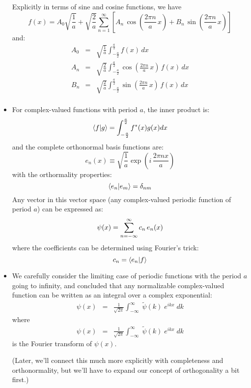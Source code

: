 \documentclass[12pt]{article}
\begin{document}
\begin{itemize}
Explicitly in terms of sine and cosine functions, we have
\begin{equation}
f(x) = A_0 \sqrt{\frac{1}{a}} + \sqrt{\frac{2}{a}} \sum_{n=1}^{\infty}  \left[ A_n \, \cos\left(\frac{2\pi n}{a} \, x \right) + B_n \, \sin\left(\frac{2\pi n}{a} \, x \right)\right]\label{eqn :lfs}
\end{equation}
and:
\begin{eqnarray*}
A_0 &=& \sqrt{\frac{1}{a}} \int_{-\frac{a}{2}}^{\frac{a}{2}} f(x) \, dx \\
A_n &=& \sqrt{\frac{2}{a}} \int_{-\frac{a}{2}}^{\frac{a}{2}} 
\cos\left(\frac{2\pi n}{a} \, x \right) \, f(x) \, dx \\
B_n &=& \sqrt{\frac{2}{a}} \int_{-\frac{a}{2}}^{\frac{a}{2}} 
\sin\left(\frac{2\pi n}{a} \, x \right) \, f(x) \, dx \\
\end{eqnarray*}

\item For complex-valued functions with period $a$, the inner product is:
\begin{equation}
\braket{f|g} = \int_{-\frac{a}{2}}^{\frac{a}{2}} f^*(x) g(x) dx
\end{equation}
and the complete orthonormal basis functions are:
\begin{equation}
e_n(x) \equiv \sqrt{\frac{1}{a}} \exp\left( i \, \frac{2 \pi n x}{a}\right)
\end{equation}
with the orthormality properties:
\begin{equation}
\braket{e_n|e_m} = \delta_{nm}
\end{equation}
Any vector in this vector space (any complex-valued periodic function of period $a$) can be expressed as:
\begin{equation}
\psi(x) = \sum_{n=-\infty}^{\infty}  c_n \, e_n(x)  \\
\end{equation}
where the coefficients can be determined using Fourier's trick:
\begin{equation}
c_n = \braket{e_n|f}
\end{equation}

\item We carefully consider the limiting case of periodic functions with the period $a$ going to infinity, and concluded that any normalizable complex-valued function can be written as an integral over a complex exponential:
\begin{eqnarray}
\psi(x) &=& \frac{1}{\sqrt{2\pi}} 
\int_{-\infty}^{\infty} \; \widetilde{\psi}(k) \; e^{ikx} \; dk
\end{eqnarray}
where
\begin{eqnarray}
\psi(x) &=& \frac{1}{\sqrt{2\pi}} 
\int_{-\infty}^{\infty} \; \widetilde{\psi}(k) \; e^{ikx} \; dk
\end{eqnarray}
is the Fourier transform of $\psi(x)$.

(Later, we'll connect this much more explicitly with completeness and orthonormality, but we'll have to expand our concept of orthogonality a bit first.)
\end{itemize}
  
\end{document}
